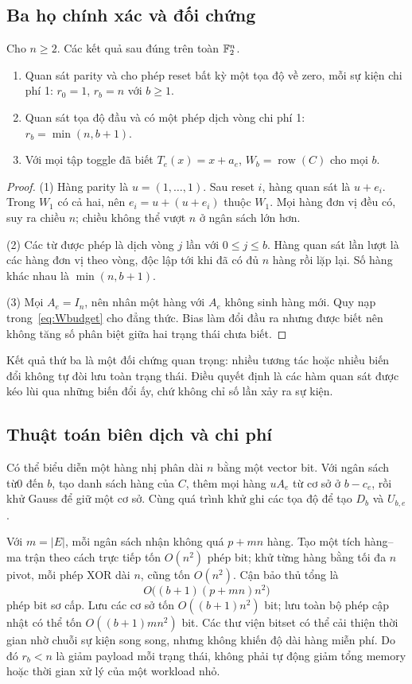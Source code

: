 \subsection{Ba họ chính xác và đối chứng}
\begin{proposition}\label{prop:families}
Cho $n\ge2$. Các kết quả sau đúng trên toàn $\mathbb F_2^n$.
\begin{enumerate}
\item Quan sát parity và cho phép reset bất kỳ một tọa độ về zero, mỗi sự kiện chi phí 1: $r_0=1$, $r_b=n$ với $b\ge1$.
\item Quan sát tọa độ đầu và có một phép dịch vòng chi phí 1: $r_b=\min(n,b+1)$.
\item Với mọi tập toggle đã biết $T_e(x)=x+a_e$, $W_b=\operatorname{row}(C)$ cho mọi $b$.
\end{enumerate}
\end{proposition}
\begin{proof}
(1) Hàng parity là $u=(1,\ldots,1)$. Sau reset $i$, hàng quan sát là $u+e_i$. Trong $W_1$ có cả hai, nên $e_i=u+(u+e_i)$ thuộc $W_1$. Mọi hàng đơn vị đều có, suy ra chiều $n$; chiều không thể vượt $n$ ở ngân sách lớn hơn.

(2) Các từ được phép là dịch vòng $j$ lần với $0\le j\le b$. Hàng quan sát lần lượt là các hàng đơn vị theo vòng, độc lập tới khi đã có đủ $n$ hàng rồi lặp lại. Số hàng khác nhau là $\min(n,b+1)$.

(3) Mọi $A_e=I_n$, nên nhân một hàng với $A_e$ không sinh hàng mới. Quy nạp trong~\eqref{eq:Wbudget} cho đẳng thức. Bias làm đổi đầu ra nhưng được biết nên không tăng số phân biệt giữa hai trạng thái chưa biết.
\end{proof}
Kết quả thứ ba là một đối chứng quan trọng: nhiều tương tác hoặc nhiều biến đổi không tự đòi lưu toàn trạng thái. Điều quyết định là các hàm quan sát được kéo lùi qua những biến đổi ấy, chứ không chỉ số lần xảy ra sự kiện.

\subsection{Thuật toán biên dịch và chi phí}
Có thể biểu diễn một hàng nhị phân dài $n$ bằng một vector bit. Với ngân sách từ0 đến $b$, tạo danh sách hàng của $C$, thêm mọi hàng $uA_e$ từ cơ sở ở $b-c_e$, rồi khử Gauss để giữ một cơ sở. Cùng quá trình khử ghi các tọa độ để tạo $D_b$ và $U_{b,e}$.

Với $m=|E|$, mỗi ngân sách nhận không quá $p+mn$ hàng. Tạo một tích hàng--ma trận theo cách trực tiếp tốn $O(n^2)$ phép bit; khử từng hàng bằng tối đa $n$ pivot, mỗi phép XOR dài $n$, cũng tốn $O(n^2)$. Cận bảo thủ tổng là
\[
O\big((b+1)(p+mn)n^2\big)
\]
phép bit sơ cấp. Lưu các cơ sở tốn $O((b+1)n^2)$ bit; lưu toàn bộ phép cập nhật có thể tốn $O((b+1)mn^2)$ bit. Các thư viện bitset có thể cải thiện thời gian nhờ chuỗi sự kiện song song, nhưng không khiến độ dài hàng miễn phí. Do đó $r_b<n$ là giảm payload mỗi trạng thái, không phải tự động giảm tổng memory hoặc thời gian xử lý của một workload nhỏ.
